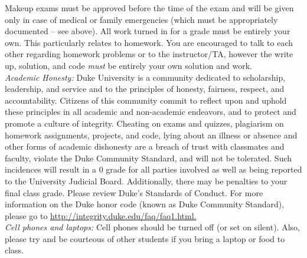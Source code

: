 \documentclass[11pt]{article}
\begin{document}
Makeup exams must be approved before the time of the exam and will be given only in case
of medical or family emergencies (which must be appropriately documented -- see above). All work turned in for a grade must be entirely your own. This particularly relates to homework. You are encouraged to talk to each other regarding homework problems or to the instructor/TA, however the write up, solution, and code \emph{must} be entirely your own solution and work. \\


\emph{Academic Honesty:} Duke University is a community dedicated to scholarship, leadership, and service and to the principles of honesty, fairness, respect, and accountability. Citizens of this community commit to reflect upon and uphold these principles in all academic and non-academic endeavors, and to protect and promote a culture of integrity. Cheating on exams and quizzes, plagiarism on homework assignments, projects, and code, lying about an illness or absence and other forms of academic dishonesty are a breach of trust with classmates and faculty, violate the Duke Community Standard, and will not be tolerated. Such incidences will result in a 0 grade for all parties involved as well as being reported to the University Judicial Board. Additionally, there may be penalties to your final class grade. Please review Duke's Standards of Conduct.
For more information on the Duke honor code (known as Duke Community Standard), please go to \url{http://integrity.duke.edu/faq/faq1.html.}\\

\emph{Cell phones and laptops:} Cell phones should be turned off (or set on silent). Also, please try and be courteous of other students if you bring a laptop or food to class. \\
\end{document}
